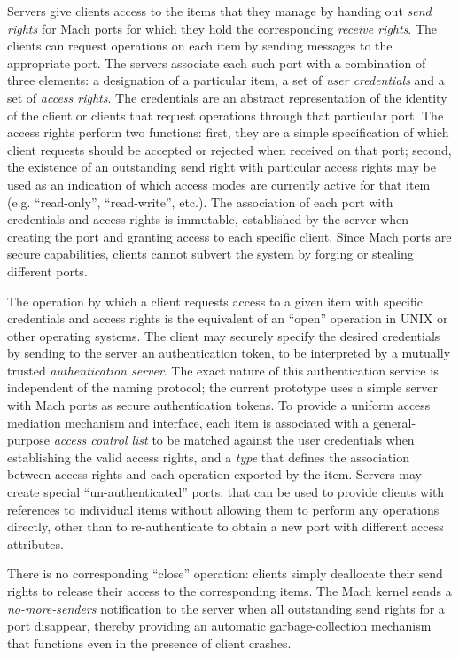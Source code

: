 Servers give clients access to the items that they manage by handing
out {\em send rights} for Mach ports for which they hold the
corresponding {\em receive rights}. The clients can request operations
on each item by sending messages to the appropriate port.  The servers
associate each such port with a combination of three elements: a
designation of a particular item, a set of {\em user credentials} and
a set of {\em access rights}.  The credentials are an abstract
representation of the identity of the client or clients that request
operations through that particular port.  The access rights perform
two functions: first, they are a simple specification of which client
requests should be accepted or rejected when received on that port;
second, the existence of an outstanding send right with particular
access rights may be used as an indication of which access modes are
currently active for that item (e.g. ``read-only'', ``read-write'',
etc.).  The association of each port with credentials and access
rights is immutable, established by the server when creating the port
and granting access to each specific client.  Since Mach ports are
secure capabilities, clients cannot subvert the system by forging or
stealing different ports.

The operation by which a client requests access to a given item with
specific credentials and access rights is the equivalent of an
``open'' operation in UNIX or other operating systems. The client may
securely specify the desired credentials by sending to the server an
authentication token, to be interpreted by a mutually trusted {\em
authentication server}.  The exact nature of this authentication
service is independent of the naming protocol; the current prototype
uses a simple server with Mach ports as secure authentication tokens.
To provide a uniform access mediation mechanism and interface, each
item is associated with a general-purpose {\em access control list} to
be matched against the user credentials when establishing the valid
access rights, and a {\em type} that defines the association between
access rights and each operation exported by the item.  Servers may
create special ``un-authenticated'' ports, that can be used to provide
clients with references to individual items without allowing them to
perform any operations directly, other than to re-authenticate to
obtain a new port with different access attributes.

There is no corresponding ``close'' operation: clients simply
deallocate their send rights to release their access to the
corresponding items.  The Mach kernel sends a {\em no-more-senders}
notification to the server when all outstanding send rights for a port
disappear, thereby providing an automatic garbage-collection mechanism
that functions even in the presence of client crashes.

